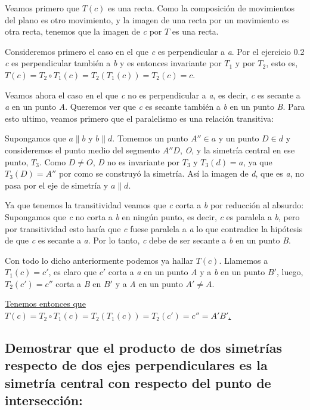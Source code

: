 \documentclass[12pt,a4paper]{article}
\begin{document}
Veamos primero que \(T(c)\) es una recta. Como la composición de movimientos del plano es otro movimiento, y la imagen de una recta por un movimiento es otra recta, tenemos que la imagen de \textit{c} por \(T\) es una recta.

Consideremos primero el caso en el que \textit{c} es perpendicular a \textit{a}. Por el ejercicio 0.2 \textit{c} es perpendicular también a \textit{b} y es entonces invariante por \(T_1\) y por \(T_2\), esto es, \underline{\(T(c) = T_2 \circ T_1 (c) = T_2(T_1(c)) = T_2(c) = c \)}.

Veamos ahora el caso en el que \textit{c} no es perpendicular a \textit{a}, es decir, \textit{c} es secante a \textit{a} en un punto \textit{A}. Queremos ver que \textit{c} es secante también a \textit{b} en un punto \textit{B}. Para esto ultimo, veamos primero que el paralelismo es una relación transitiva:

Supongamos que \( a \parallel b \) y \(b \parallel d \). Tomemos un punto \(A'' \in a \) y un punto \(D \in d \) y consideremos el punto medio del segmento \(A''D\), \textit{O}, y la simetría central en ese punto, \(T_3\). Como \(D \neq O \), \textit{D} no es invariante por \(T_3\) y \(T_3(d) = a\), ya que \(T_3(D) = A''\) por como se construyó la simetría. Así la imagen de \textit{d}, que es \textit{a}, no pasa por el eje de simetría y \(a \parallel d\).

Ya que tenemos la transitividad veamos que \textit{c} corta a  \textit{b} por reducción al absurdo: Supongamos que \textit{c} no corta a \textit{b} en ningún punto, es decir, \textit{c} es paralela a \textit{b}, pero por transitividad esto haría que \textit{c} fuese paralela a \textit{a} lo que contradice la hipótesis de que \textit{c} es secante a \textit{a}. Por lo tanto, \textit{c} debe de ser secante a \textit{b} en un punto \textit{B}.

Con todo lo dicho anteriormente podemos ya hallar \(T(c)\). Llamemos a \(T_1(c) = c'\), es claro que \(c'\) corta a \textit{a} en un punto \textit{A} y a \textit{b} en un punto \(B'\), luego, \(T_2(c') = c''\) corta a \textit{B} en \(B'\) y a \textit{A} en un punto \(A'\neq A\).

 \underline{Tenemos entonces que \(T(c) = T_2 \circ T_1(c) = T_2(T_1(c)) = T_2(c') = c'' = A'B'\).}
 
 \subsection{Demostrar que el producto de dos simetrías respecto de dos ejes perpendiculares es la simetría central con respecto del punto de intersección:}
 
\end{document}
